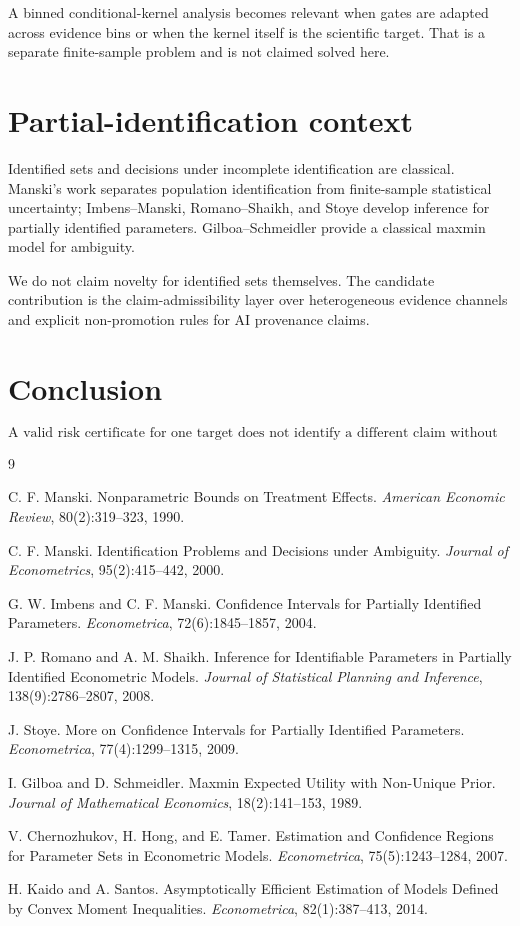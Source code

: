 \documentclass[11pt]{article}
\begin{document}
A binned conditional-kernel analysis becomes relevant when gates are adapted
across evidence bins or when the kernel itself is the scientific target. That
is a separate finite-sample problem and is not claimed solved here.

\section{Partial-identification context}

Identified sets and decisions under incomplete identification are classical.
Manski's work separates population identification from finite-sample
statistical uncertainty; Imbens--Manski, Romano--Shaikh, and Stoye develop
inference for partially identified parameters. Gilboa--Schmeidler provide a
classical maxmin model for ambiguity.

We do not claim novelty for identified sets themselves. The candidate
contribution is the claim-admissibility layer over heterogeneous evidence
channels and explicit non-promotion rules for AI provenance claims.

\section{Conclusion}

\[
\boxed{
\text{A valid risk certificate for one target does not identify a different
claim without assumptions or evidence that identify that claim.}
}
\]

\begin{thebibliography}{9}

C. F. Manski.
Nonparametric Bounds on Treatment Effects.
\emph{American Economic Review}, 80(2):319--323, 1990.

C. F. Manski.
Identification Problems and Decisions under Ambiguity.
\emph{Journal of Econometrics}, 95(2):415--442, 2000.

G. W. Imbens and C. F. Manski.
Confidence Intervals for Partially Identified Parameters.
\emph{Econometrica}, 72(6):1845--1857, 2004.

J. P. Romano and A. M. Shaikh.
Inference for Identifiable Parameters in Partially Identified Econometric Models.
\emph{Journal of Statistical Planning and Inference}, 138(9):2786--2807, 2008.

J. Stoye.
More on Confidence Intervals for Partially Identified Parameters.
\emph{Econometrica}, 77(4):1299--1315, 2009.

I. Gilboa and D. Schmeidler.
Maxmin Expected Utility with Non-Unique Prior.
\emph{Journal of Mathematical Economics}, 18(2):141--153, 1989.

V. Chernozhukov, H. Hong, and E. Tamer.
Estimation and Confidence Regions for Parameter Sets in Econometric Models.
\emph{Econometrica}, 75(5):1243--1284, 2007.

H. Kaido and A. Santos.
Asymptotically Efficient Estimation of Models Defined by Convex Moment
Inequalities.
\emph{Econometrica}, 82(1):387--413, 2014.

\end{thebibliography}
\end{document}
